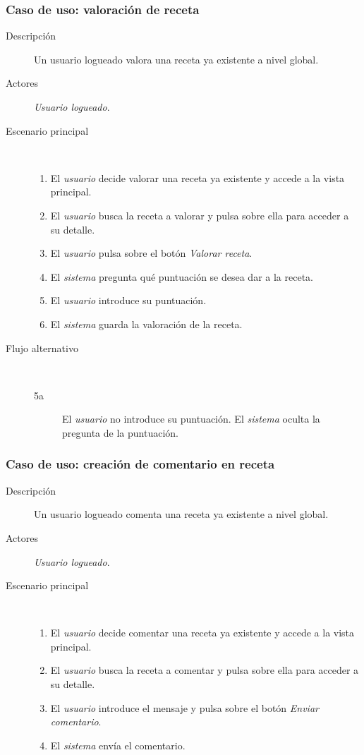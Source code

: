 \subsubsection{Caso de uso: valoración de receta}

\begin{description}
\item[Descripción] Un usuario logueado valora una receta ya existente a nivel
global.
\item[Actores] \textit{Usuario logueado}.
\item[Escenario principal] $\quad$
  \begin{enumerate}
  \item El \textit{usuario} decide valorar una receta ya existente y accede a
  la vista principal.
  \item El \textit{usuario} busca la receta a valorar y pulsa sobre ella para
  acceder a su detalle.
  \item El \textit{usuario} pulsa sobre el botón \textit{Valorar receta}.
  \item El \textit{sistema} pregunta qué puntuación se desea dar a la receta.
  \item El \textit{usuario} introduce su puntuación.
  \item El \textit{sistema} guarda la valoración de la receta.
  \end{enumerate}
\item[Flujo alternativo] $\quad$
  \begin{description}
  \item[5a] El \textit{usuario} no introduce su puntuación. El \textit{sistema}
  oculta la pregunta de la puntuación.
  \end{description}
\end{description}


\subsubsection{Caso de uso: creación de comentario en receta}

\begin{description}
\item[Descripción] Un usuario logueado comenta una receta ya existente a nivel
global.
\item[Actores] \textit{Usuario logueado}.
\item[Escenario principal] $\quad$
  \begin{enumerate}
  \item El \textit{usuario} decide comentar una receta ya existente y accede a
  la vista principal.
  \item El \textit{usuario} busca la receta a comentar y pulsa sobre ella para
  acceder a su detalle.
  \item El \textit{usuario} introduce el mensaje y pulsa sobre el botón
  \textit{Enviar comentario}.
  \item El \textit{sistema} envía el comentario.
  \end{enumerate}
\end{description}



